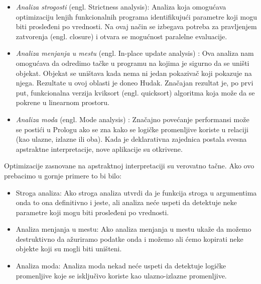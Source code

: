 \begin{itemize}
\item \textit{Analiza strogosti} (engl. Strictness analysis\cite{AbramskyHankin}):
Analiza koja omogućava optimizaciju lenjih funkcionalnih programa identifikujući parametre koji mogu biti prosleđeni po vrednosti. Na ovaj način se izbegava potreba za pravljenjem zatvorenja (engl. closure) i otvara se mogućnost paralelne evaluacije. 

\item \textit{Analiza menjanja u mestu} (engl. In-place update analysis) \cite{CannPhd}:
Ova analiza nam omogućava da odredimo tačke u programu na kojima je sigurno da se uništi objekat. Objekat se uništava kada nema ni jedan pokazivač koji pokazuje na njega. Rezultate u ovoj oblasti je doneo Hudak. Značajan rezultat je, po prvi put, funkcionalna verzija kviksort (engl. quicksort) algoritma koja može da se pokrene u linearnom prostoru. \cite{Girard1987}


\item \textit{Analiza moda} (engl. Mode analysis) \cite{AbramskyHankin}:
Značajno povećanje performansi može se postići u Prologu ako se zna kako se logičke promenljive koriste u relaciji (kao ulazne, izlazne ili oba).
Kada je deklarativna zajednica postala svesna apstraktne interpretacije, nove aplikacije su otkrivene. 

\end{itemize}
Optimizacije zasnovane na apstraktnoj interpretaciji su verovatno tačne. Ako ovo prebacimo u gornje primere to bi bilo:

\begin{itemize}
\item Stroga analiza:
Ako stroga analiza utvrdi da je funkcija stroga u argumentima onda to ona definitivno i jeste, ali analiza neće uspeti da detektuje neke parametre koji mogu biti prosleđeni po vrednosti. 

\item Analiza menjanja u mestu:
Ako analiza menjanja u mestu ukaže da možemo destruktivno da ažuriramo podatke onda i možemo ali ćemo kopirati neke objekte koji su mogli biti uništeni. \cite{Girard1987}


\item Analiza moda:
Analiza moda nekad neće uspeti da detektuje logičke promenljive koje se isključivo koriste kao ulazno-izlazne promenljive. 

\end{itemize}


